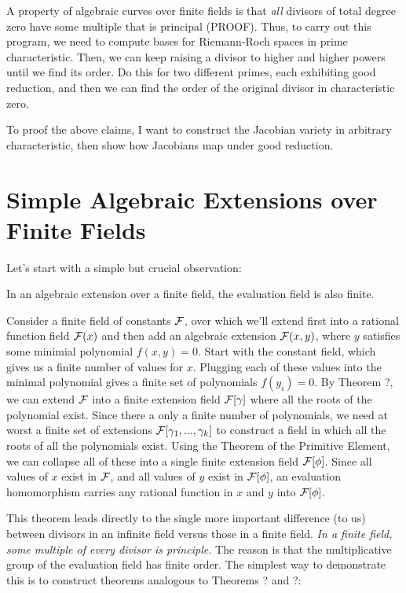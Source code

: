 A property of algebraic curves over finite fields is that {\it all}
divisors of total degree zero have some multiple that is principal
(PROOF).  Thus, to carry out this program, we need to compute bases
for Riemann-Roch spaces in prime characteristic.  Then, we can keep
raising a divisor to higher and higher powers until we find its order.
Do this for two different primes, each exhibiting good reduction, and
then we can find the order of the original divisor in characteristic
zero.

To proof the above claims, I want to construct the Jacobian variety in
arbitrary characteristic, then show how Jacobians map under good
reduction.

\section{Simple Algebraic Extensions over Finite Fields}

Let's start with a simple but crucial observation:

\theorem

In an algebraic extension over a finite field, the evaluation field is
also finite.

\proof

Consider a finite field of constants ${\cal F}$, over which we'll
extend first into a rational function field ${\cal F}(x)$ and then add
an algebraic extension ${\cal F}(x,y)$, where $y$ satisfies some
minimial polynomial $f(x,y)=0$.  Start with the constant field, which
gives us a finite number of values for $x$.  Plugging each of these
values into the minimal polynomial gives a finite set of polynomials
$f(y_i)=0$.  By Theorem ?, we can extend ${\cal F}$ into a finite
extension field ${\cal F}[\gamma]$ where all the roots of the
polynomial exist.  Since there a only a finite number of polynomials,
we need at worst a finite set of extensions ${\cal
F}[\gamma_1,...,\gamma_k]$ to construct a field in which all the roots
of all the polynomials exist.  Using the Theorem of the Primitive
Element, we can collapse all of these into a single finite extension
field ${\cal F}[\phi]$.  Since all values of $x$ exist in ${\cal F}$,
and all values of $y$ exist in ${\cal F}[\phi]$, an evaluation
homomorphism carries any rational function in $x$ and $y$ into
${\cal F}[\phi]$.

\endtheorem

This theorem leads directly to the single more important difference
(to us) between divisors in an infinite field versus those in a finite
field.  {\it In a finite field, some multiple of every divisor is
principle.}  The reason is that the multiplicative group of the
evaluation field has finite order.  The simplest way to demonstrate
this is to construct theorems analogous to Theorems ? and ?:

